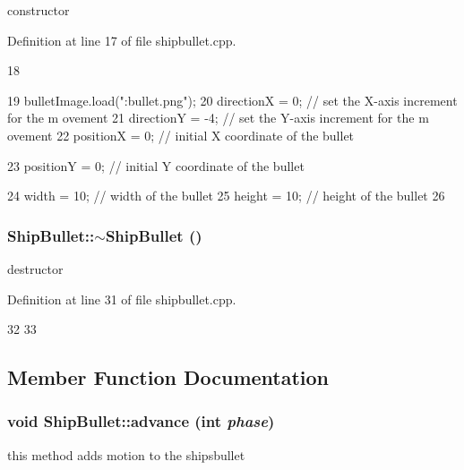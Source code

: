 constructor 

Definition at line 17 of file shipbullet.cpp.


\begin{DoxyCode}
18 {
19     bulletImage.load(":bullet.png");
20     directionX = 0;                         // set the X-axis increment for the m
      ovement
21     directionY = -4;                        // set the Y-axis increment for the m
      ovement
22     positionX = 0;                          // initial X coordinate of the bullet
      
23     positionY = 0;                          // initial Y coordinate of the bullet
      
24     width = 10;                             // width of the bullet
25     height = 10;                            // height of the bullet
26 }
\end{DoxyCode}
\hypertarget{class_ship_bullet_aa315ad339632eabf0121e761084a1d87}{
\subsubsection[{$\sim$ShipBullet}]{\setlength{\rightskip}{0pt plus 5cm}ShipBullet::$\sim$ShipBullet ()}}
\label{class_ship_bullet_aa315ad339632eabf0121e761084a1d87}
destructor 

Definition at line 31 of file shipbullet.cpp.


\begin{DoxyCode}
32 {
33 }
\end{DoxyCode}


\subsection{Member Function Documentation}
\hypertarget{class_ship_bullet_ad2b81da446941edb9ec54a7603ed1212}{
\subsubsection[{advance}]{\setlength{\rightskip}{0pt plus 5cm}void ShipBullet::advance (int {\em phase})}}
\label{class_ship_bullet_ad2b81da446941edb9ec54a7603ed1212}
this method adds motion to the shipsbullet 

